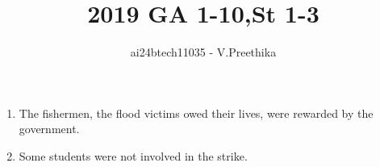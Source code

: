 \documentclass[journal]{IEEEtran}
\begin{document}

\vspace{3cm}

\title{2019 GA 1-10,St 1-3}
\author{ai24btech11035 - V.Preethika}
\maketitle
\bigskip

\renewcommand{\thefigure}{\theenumi}
\renewcommand{\thetable}{\theenumi}
\begin{enumerate}
\item The fishermen, \underline{\hspace{1cm}} the flood victims owed their lives, were rewarded by the government.
\begin{enumerate}
\end{enumerate}
\item Some students were not involved in the strike.



\end{enumerate}
\end{document}
